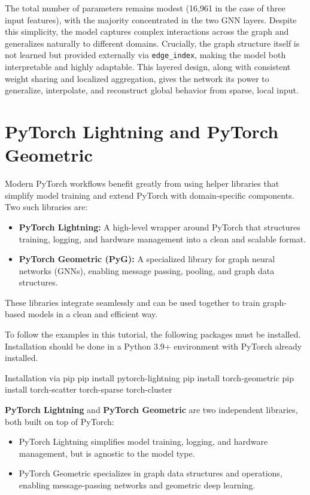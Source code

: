 The total number of parameters remains modest (16{,}961 in the case of three input features), with the majority concentrated in the two GNN layers. Despite this simplicity, the model captures complex interactions across the graph and generalizes naturally to different domains. Crucially, the graph structure itself is not learned but provided externally via {\tt edge\_index}, making the model both interpretable and highly adaptable. This layered design, along with consistent weight sharing and localized aggregation, gives the network its power to generalize, interpolate, and reconstruct global behavior from sparse, local input.


%
\section{PyTorch Lightning and PyTorch Geometric}

Modern PyTorch workflows benefit greatly from using helper libraries that simplify model training and extend PyTorch with domain-specific components. Two such libraries are:

\begin{itemize}
  \item {\bf PyTorch Lightning:} A high-level wrapper around PyTorch that structures training, logging, and hardware management into a clean and scalable format.
  \item {\bf PyTorch Geometric (PyG):} A specialized library for graph neural networks (GNNs), enabling message passing, pooling, and graph data structures.
\end{itemize}

These libraries integrate seamlessly and can be used together to train graph-based models in a clean and efficient way.

To follow the examples in this tutorial, the following packages must be installed. Installation should be done in a Python 3.9+ environment with PyTorch already installed.

\begin{codeonly}{Installation via pip}
pip install pytorch-lightning
pip install torch-geometric
pip install torch-scatter torch-sparse torch-cluster
\end{codeonly}

{\bf PyTorch Lightning} and {\bf PyTorch Geometric} are two independent libraries, both built on top of PyTorch:
\begin{itemize}
  \item PyTorch Lightning simplifies model training, logging, and hardware management, but is agnostic to the model type.
  \item PyTorch Geometric specializes in graph data structures and operations, enabling message-passing networks and geometric deep learning.
\end{itemize}

